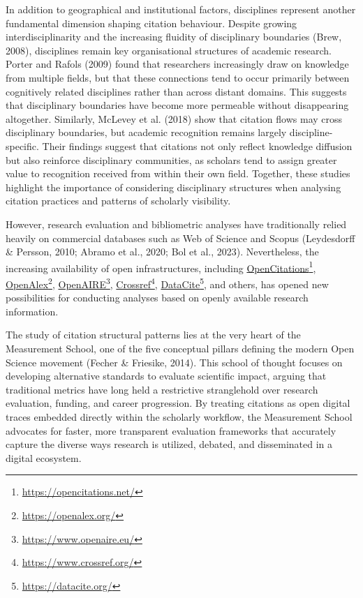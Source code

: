 \documentclass[year=2026]{cup-journal}
\begin{document}
In addition to geographical and institutional factors, disciplines represent another fundamental dimension shaping citation behaviour. Despite growing interdisciplinarity and the increasing fluidity of disciplinary boundaries (Brew, 2008), disciplines remain key organisational structures of academic research. Porter and Rafols (2009) found that researchers increasingly draw on knowledge from multiple fields, but that these connections tend to occur primarily between cognitively related disciplines rather than across distant domains. This suggests that disciplinary boundaries have become more permeable without disappearing altogether. Similarly, McLevey et al. (2018) show that citation flows may cross disciplinary boundaries, but academic recognition remains largely discipline-specific. Their findings suggest that citations not only reflect knowledge diffusion but also reinforce disciplinary communities, as scholars tend to assign greater value to recognition received from within their own field. Together, these studies highlight the importance of considering disciplinary structures when analysing citation practices and patterns of scholarly visibility.

However, research evaluation and bibliometric analyses have traditionally relied heavily on commercial databases such as Web of Science and Scopus (Leydesdorff \& Persson, 2010; Abramo et al., 2020; Bol et al., 2023). Nevertheless, the increasing availability of open infrastructures, including \href{https://opencitations.net/}{OpenCitations}\footnote{\url{https://opencitations.net/}}, \href{https://openalex.org/}{OpenAlex}\footnote{\url{https://openalex.org/}}, \href{https://www.openaire.eu/}{OpenAIRE}\footnote{\url{https://www.openaire.eu/}}, \href{https://www.crossref.org/}{Crossref}\footnote{\url{https://www.crossref.org/}}, \href{https://datacite.org/}{DataCite}\footnote{\url{https://datacite.org/}}, and others, has opened new possibilities for conducting analyses based on openly available research information.

The study of citation structural patterns lies at the very heart of the Measurement School, one of the five conceptual pillars defining the modern Open Science movement (Fecher \& Friesike, 2014). This school of thought focuses on developing alternative standards to evaluate scientific impact, arguing that traditional metrics have long held a restrictive stranglehold over research evaluation, funding, and career progression. By treating citations as open digital traces embedded directly within the scholarly workflow, the Measurement School advocates for faster, more transparent evaluation frameworks that accurately capture the diverse ways research is utilized, debated, and disseminated in a digital ecosystem.
\end{document}
